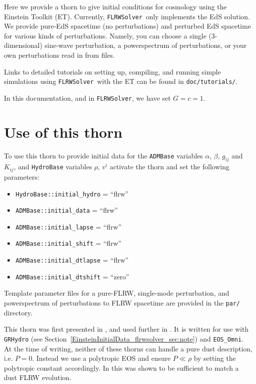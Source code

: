 Here we provide a thorn to give initial conditions for cosmology using the Einstein Toolkit (ET). Currently, \texttt{FLRWSolver}\ only implements the EdS solution. We provide pure-EdS spacetime (no perturbations) and perturbed EdS spacetime for various kinds of perturbations. Namely, you can choose a single (3-dimensional) sine-wave perturbation, a powerspectrum of perturbations, or your own perturbations read in from files. 

Links to detailed tutorials on setting up, compiling, and running simple simulations using \texttt{FLRWSolver}\ with the ET can be found in \texttt{doc/tutorials/}.

In this documentation, and in \texttt{FLRWSolver}, we have set $G=c=1$.

\section{Use of this thorn}

To use this thorn to provide initial data for the {\tt ADMBase} variables $\alpha$, $\beta$, $g_{ij}$ and $K_{ij}$, and {\tt HydroBase} variables $\rho$, $v^i$ activate the thorn and set the following parameters: 
\begin{itemize}
	\item \texttt{HydroBase::initial\_hydro} = ``flrw''
	\item \texttt{ADMBase::initial\_data} = ``flrw''
	\item \texttt{ADMBase::initial\_lapse} = ``flrw''
	\item \texttt{ADMBase::initial\_shift} = ``flrw''
	\item \texttt{ADMBase::initial\_dtlapse} = ``flrw''
	\item \texttt{ADMBase::initial\_dtshift} = ``zero''
\end{itemize}

Template parameter files for a pure-FLRW, single-mode perturbation, and powerspectrum of perturbations to FLRW spacetime are provided in the {\tt par/} directory. 

This thorn was first presented in \cite{EinsteinInitialData_flrwsolver_macpherson2017}, and used further in \cite{EinsteinInitialData_flrwsolver_macpherson2019}. It is written for use with {\tt GRHydro} (see Section~\ref{EinsteinInitialData_flrwsolver_sec:note}) and {\tt EOS\_Omni}. At the time of writing, neither of these thorns can handle a pure dust description, i.e. $P=0$. Instead we use a polytropic EOS and ensure $P\ll\rho$ by setting the polytropic constant accordingly. In \cite{EinsteinInitialData_flrwsolver_macpherson2017} this was shown to be sufficient to match a dust FLRW evolution.




